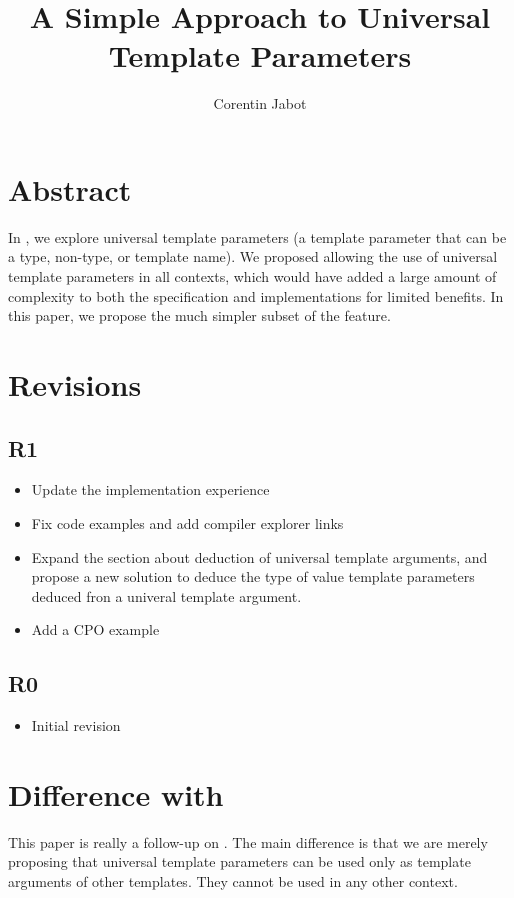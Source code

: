 \documentclass{wg21}
\title{A Simple Approach to Universal Template Parameters}
\author{Corentin Jabot}{corentin.jabot@gmail.com}
\begin{document}
\maketitle

\section{Abstract}
In , we explore universal template parameters (a template parameter that can be a type, non-type, or template name).
We proposed allowing the use of universal template parameters in all contexts, which would have added a large amount of complexity to both the specification and implementations
for limited benefits. In this paper, we propose the much simpler subset of the feature.


\section{Revisions}

\subsection{R1}

\begin{itemize}
    \item Update the implementation experience
    \item Fix code examples and add compiler explorer links
    \item Expand the section about deduction of universal template arguments, and propose a new solution to deduce the type of value template parameters deduced fron a univeral template argument.
    \item Add a CPO example
\end{itemize}

\subsection{R0}

\begin{itemize}
    \item{Initial revision}
\end{itemize}


\section{Difference with }

This paper is really a follow-up on .
The main difference is that we are merely proposing that universal template parameters can be used only as template arguments of other templates.
They cannot be used in any other context.
\end{document}
